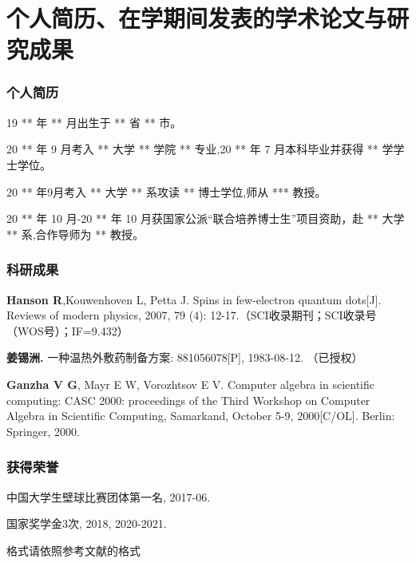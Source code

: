 
\chapter*{个人简历、在学期间发表的学术论文与研究成果}
{}
\subsection*{\bfseries 个人简历}

19 ** 年 ** 月出生于 ** 省 ** 市。

20 ** 年 9 月考入 ** 大学 ** 学院 ** 专业,20 ** 年 7 月本科毕业并获得 ** 学学士学位。

20 ** 年9月考入 ** 大学 ** 系攻读 ** 博士学位,师从 *** 教授。

20 ** 年 10 月-20 ** 年 10 月获国家公派“联合培养博士生”项目资助，赴 ** 大学 ** 系,合作导师为 ** 教授。


\subsection*{\bfseries 科研成果}

\setlength{\parskip}{6pt}
\begin{enumerate}[label={[\arabic*]}]
  \item \textbf{Hanson R},Kouwenhoven L, Petta J. Spins in few-electron quantum dots[J]. Reviews of modern physics, 2007, 79 (4): 12-17.（SCI收录期刊；SCI收录号（WOS号）；IF=9.432）%
  \item \textbf{姜锡洲.} 一种温热外敷药制备方案: 881056078[P], 1983-08-12. （已授权）
  \item \textbf{Ganzha V G}, Mayr E W, Vorozhtsov E V. Computer algebra in scientific computing: CASC 2000: proceedings of the Third Workshop on Computer Algebra in Scientific Computing, Samarkand, October 5-9, 2000[C/OL]. Berlin: Springer, 2000.
\end{enumerate}

\subsection*{\bfseries 获得荣誉}
\begin{enumerate}[label={[\arabic*]}]
  \item 中国大学生壁球比赛团体第一名, 2017-06.
  \item 国家奖学金3次, 2018, 2020-2021.
\end{enumerate}

格式请依照参考文献的格式

